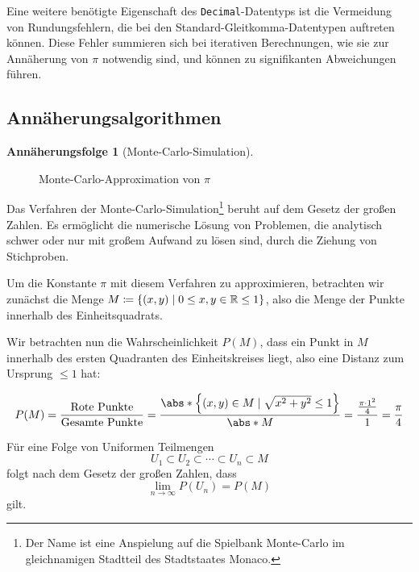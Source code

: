 \documentclass{scrartcl}
\theoremstyle{definition}
\newtheorem{approximation sequence}{Annäherungsfolge}
\DeclarePairedDelimiter{\set}{\lbrace}{\rbrace}
\DeclarePairedDelimiter{\tuple}{\lparen}{\rparen}
\newcommand{\field}[1]{\mathbb{#1}}
\newcommand{\reals}{\field{R}}
\begin{document}
Eine weitere benötigte Eigenschaft des \texttt{Decimal}-Datentyps ist die
Vermeidung von Rundungsfehlern, die bei den Standard-Gleitkomma-Datentypen
auftreten können. Diese Fehler summieren sich bei iterativen Berechnungen, wie
sie zur Annäherung von \(\pi\) notwendig sind, und können zu signifikanten
Abweichungen führen.

\subsection{Annäherungsalgorithmen}

\begin{approximation sequence}[Monte-Carlo-Simulation]~\\[12pt]
\begin{figure}[H]
    \centering
    
    \caption{Monte-Carlo-Approximation von \(\pi\)}
    \label{fig:monte-carlo-approximation}
\end{figure}

Das Verfahren der Monte-Carlo-Simulation\footnote{Der Name ist eine Anspielung
auf die Spielbank Monte-Carlo im gleichnamigen Stadtteil des Stadtstaates
Monaco.\cite{anderson:1986:metropolis}} beruht auf dem Gesetz der großen
Zahlen. Es ermöglicht die numerische Lösung von Problemen, die analytisch
schwer oder nur mit großem Aufwand zu lösen sind, durch die Ziehung von
Stichproben.

Um die Konstante \(\pi\) mit diesem Verfahren zu approximieren, betrachten wir
zunächst die Menge \(M \coloneq \set{\tuple{x, y} \mid 0 \le x,y \in \reals \le
1 }\), also die Menge der Punkte innerhalb des Einheitsquadrats.

Wir betrachten nun die Wahrscheinlichkeit \(P(M)\), dass ein Punkt in \(M\)
innerhalb des ersten Quadranten des Einheitskreises liegt, also eine Distanz
zum Ursprung \(\le 1\) hat:

\begin{equation}
    P(M)
    = \frac{\text{Rote Punkte}}{\text{Gesamte Punkte}}
    = \frac{\abs*{\set*{(x, y) \in M \mid \sqrt{x^2 + y^2} \le 1}}}{\abs*{M}}
    = \frac{\frac{\pi \cdot 1^2}{4}}{1}
    = \frac{\pi}{4}
\end{equation}

Für eine Folge von Uniformen Teilmengen
\begin{equation}
    U_1 \subset U_2 \subset \cdots \subset U_n \subset M
\end{equation}
folgt nach dem Gesetz der großen Zahlen, dass
\begin{equation}
    \lim_{n \to \infty} P(U_n) = P(M)
\end{equation}
gilt.


\end{approximation sequence}
\end{document}
